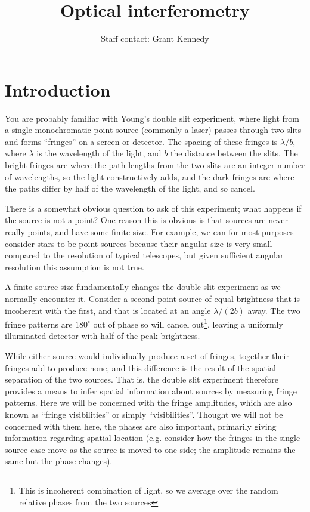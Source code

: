 \documentclass[11pt]{article}
\title{Optical interferometry}
\author{Staff contact: Grant Kennedy}
\date{}                                           %
\begin{document}
\maketitle

\tableofcontents

\section{Introduction}

You are probably familiar with Young's double slit experiment, where light from a single monochromatic point source (commonly a laser) passes through two slits and forms ``fringes'' on a screen or detector. The spacing of these fringes is $\lambda/b$, where $\lambda$ is the wavelength of the light, and $b$ the distance between the slits. The bright fringes are where the path lengths from the two slits are an integer number of wavelengths, so the light constructively adds, and the dark fringes are where the paths differ by half of the wavelength of the light, and so cancel.

There is a somewhat obvious question to ask of this experiment; what happens if the source is not a point? One reason this is obvious is that sources are never really points, and have some finite size. For example, we can for most purposes consider stars to be point sources because their angular size is very small compared to the resolution of typical telescopes, but given sufficient angular resolution this assumption is not true.

A finite source size fundamentally changes the double slit experiment as we normally encounter it. Consider a second point source of equal brightness that is incoherent with the first, and that is located at an angle $\lambda/(2b)$ away. The two fringe patterns are $180^\circ$ out of phase so will cancel out\footnote{This is incoherent combination of light, so we average over the random relative phases from the two sources}, leaving a uniformly illuminated detector with half of the peak brightness.

While either source would individually produce a set of fringes, together their fringes add to produce none, and this difference is the result of the spatial separation of the two sources. That is, the double slit experiment therefore provides a means to infer spatial information about sources by measuring fringe patterns. Here we will be concerned with the fringe amplitudes, which are also known as ``fringe visibilities'' or simply ``visibilities''. Thought we will not be concerned with them here, the phases are also important, primarily giving information regarding spatial location (e.g. consider how the fringes in the single source case move as the source is moved to one side; the amplitude remains the same but the phase changes).
\end{document}
